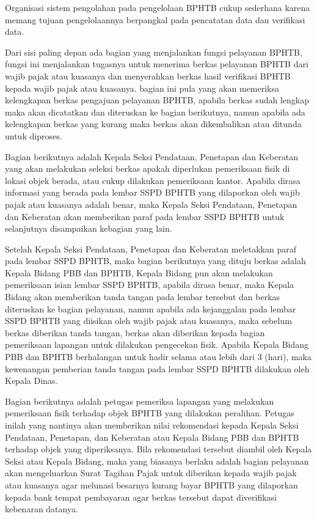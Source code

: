 \documentclass[pdftex,12pt, oneside]{article}
\begin{document}
Organisasi sistem pengolahan pada pengelolaan BPHTB cukup sederhana karena memang tujuan pengelolaannya berpangkal pada pencatatan data dan verifikasi data.

Dari sisi paling depan ada bagian yang menjalankan fungsi pelayanan BPHTB, fungsi ini menjalankan tugasnya untuk menerima berkas pelayanan BPHTB dari wajib pajak atau kuasanya dan menyerahkan berkas hasil verifikasi BPHTB kepada wajib pajak atau kuasanya. bagian ini pula yang akan memeriksa kelengkapan berkas pengajuan pelayanan BPHTB, apabila berkas sudah lengkap maka akan dicatatkan dan diteruskan ke bagian berikutnya, namun apabila ada kelengkapan berkas yang kurang maka berkas akan dikembalikan atau ditunda untuk diproses.

Bagian berikutnya adalah Kepala Seksi Pendataan, Penetapan dan Keberatan yang akan melakukan seleksi berkas apakah diperlukan pemeriksaan fisik di lokasi objek berada, atau cukup dilakukan pemeriksaan kantor. Apabila dirasa informasi yang berada pada lembar SSPD BPHTB yang dilaporkan oleh wajib pajak atau kuasanya adalah benar, maka Kepala Seksi Pendataan, Penetapan dan Keberatan akan memberikan paraf pada lembar SSPD BPHTB untuk selanjutnya disampaikan kebagian yang lain. 

Setelah Kepala Seksi Pendataan, Penetapan dan Keberatan meletakkan paraf pada lembar SSPD BPHTB, maka bagian berikutnya yang dituju berkas adalah Kepala Bidang PBB dan BPHTB, Kepala Bidang pun akan melakukan pemeriksaan isian lembar SSPD BPHTB, apabila dirasa benar, maka Kepala Bidang akan memberikan tanda tangan pada lembar tersebut dan berkas diteruskan ke bagian pelayanan, namun apabila ada kejanggalan pada lembar SSPD BPHTB yang diisikan oleh wajib pajak atau kuasanya, maka sebelum berkas diberikan tanda tangan, berkas akan diberikan kepada bagian pemeriksaan lapangan untuk dilakukan pengecekan fisik.
Apabila Kepala Bidang PBB dan BPHTB berhalangan untuk hadir selama atau lebih dari 3 (hari), maka kewenangan pemberian tanda tangan pada lembar SSPD BPHTB dilakukan oleh Kepala Dinas.

Bagian berikutnya adalah petugas pemeriksa lapangan yang melakukan pemeriksaan fisik terhadap objek BPHTB yang dilakukan peralihan. Petugas inilah yang nantinya akan memberikan nilai rekomendasi kepada Kepala Seksi Pendataan, Penetapan, dan Keberatan atau Kepala Bidang PBB dan BPHTB terhadap objek yang diperiksanya. Bila rekomendasi tersebut diambil oleh Kepala Seksi atau Kepala Bidang, maka yang biasanya berlaku adalah bagian pelayanan akan mengeluarkan Surat Tagihan Pajak untuk diberikan kepada wajib pajak atau kuasanya agar melunasi besarnya kurang bayar BPHTB yang dilaporkan kepada bank tempat pembayaran agar berkas tersebut dapat diverifikasi kebenaran datanya.
\end{document}
